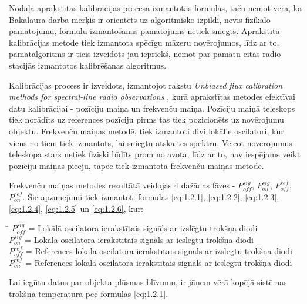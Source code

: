 

Nodaļā aprakstītas kalibrācijas procesā izmantotās formulas, taču ņemot vērā, ka Bakalaura darba mērķis ir orientēts uz algoritmisko izpildi, nevis fizikālo pamatojumu, formulu izmantošanas pamatojums netiek sniegts. Aprakstītā kalibrācijas metode tiek izmantota spēcīgu māzeru novērojumos, līdz ar to, pamatalgoritms ir ticis izveidots jau iepriekš, ņemot par pamatu citās radio stacijās izmantotos kalibrēšanas algoritmus.

Kalibrācijas process ir izveidots, izmantojot rakstu \textit{Unbiased flux calibration methods for spectral-line radio observations} \cite{unbiased}, kurā aprakstītas metodes efektīvai datu kalibrācijai - pozīciju maiņa un frekvenču maiņa. Pozīciju maiņā teleskops tiek norādīts uz references pozīciju pirms tas tiek pozicionēts uz novērojumu objektu.
Frekvenču maiņas metodē, tiek izmantoti divi lokālie oscilatori, kur viens no tiem tiek izmantots, lai sniegtu atskaites spektru. Veicot novērojumus teleskopa stars netiek fiziski bīdīts prom no avota, līdz ar to, nav iespējams veikt pozīciju maiņas pieeju, tāpēc tiek izmantota frekvenču maiņas metode.

Frekvenču maiņas metodes rezultātā veidojas 4 dažādas fāzes - $P_{off}^{sig}$, $P_{on}^{sig}$, $P_{off}^{ref}$, $P_{on}^{ref}$. Šie apzīmējumi tiek izmantoti formulās \eqref{eq:1.2.1}, \eqref{eq:1.2.2}, \eqref{eq:1.2.3}, \eqref{eq:1.2.4}, \eqref{eq:1.2.5} un \eqref{eq:1.2.6},
kur: 
\begin{tabbing}
\phantom{\hspace{10mm}}\= \kill
$P_{off}^{sig}$\> = Lokālā oscilatora ierakstītais signāls ar izslēgtu trokšņa diodi\\
$P_{on}^{sig}$\>   = Lokālā oscilatora ierakstītais signāls ar ieslēgtu trokšņa diodi\\
$P_{off}^{ref}$\>   = References lokālā oscilatora ierakstītais signāls ar izslēgtu trokšņa diodi\\
$P_{on}^{ref}$\> = References lokālā oscilatora ierakstītais signāls ar ieslēgtu trokšņa diodi\\
\end{tabbing}

Lai iegūtu datus par objekta plūsmas blīvumu, ir jāņem vērā kopējā sistēmas trokšņa temperatūra pēc formulas \ref{eq:1.2.1}. 

